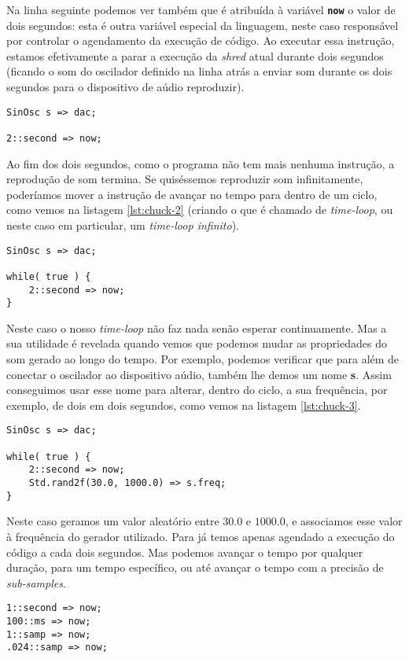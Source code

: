 Na linha seguinte podemos ver também que é atribuída à variável \textbf{\texttt{now}} o valor de dois segundos: esta é outra variável especial da linguagem, neste caso responsável por controlar o agendamento da execução de código. Ao executar essa instrução, estamos efetivamente a parar a execução da \textit{shred} atual durante dois segundos (ficando o som do oscilador definido na linha atrás a enviar som durante os dois segundos para o dispositivo de aúdio reproduzir).
\begin{lstlisting}[caption={Reproduzir um oscilador durante dois segundos},label={lst:chuck-1}]
SinOsc s => dac;

2::second => now;
\end{lstlisting}

Ao fim dos dois segundos, como o programa não tem mais nenhuma instrução, a reprodução de som termina. Se quiséssemos reproduzir som infinitamente, poderíamos mover a instrução de avançar no tempo para dentro de um ciclo, como vemos na listagem \ref{lst:chuck-2} (criando o que é chamado de \textit{time-loop}, ou neste caso em particular, um \textit{time-loop infinito}).

\begin{lstlisting}[caption={Reproduzir um oscilador infinitamente},label={lst:chuck-2}]
SinOsc s => dac;

while( true ) {
    2::second => now;
}
\end{lstlisting}

Neste caso o nosso \textit{time-loop} não faz nada senão esperar continuamente. Mas a sua utilidade é revelada quando vemos que podemos mudar as propriedades do som gerado ao longo do tempo. Por exemplo, podemos verificar que para além de conectar o oscilador ao dispositivo aúdio, também lhe demos um nome \textbf{s}. Assim conseguimos usar esse nome para alterar, dentro do ciclo, a sua frequência, por exemplo, de dois em dois segundos, como vemos na listagem \ref{lst:chuck-3}.
\begin{lstlisting}[caption={Reproduzir um oscilador, variando a frequência a cada 2 segundos},label={lst:chuck-3}]
SinOsc s => dac;

while( true ) {
    2::second => now;
    Std.rand2f(30.0, 1000.0) => s.freq;
}
\end{lstlisting}

Neste caso geramos um valor aleatório entre $30.0$ e $1000.0$, e associamos esse valor à frequência do gerador utilizado. Para já temos apenas agendado a execução do código a cada dois segundos. Mas podemos avançar o tempo por qualquer duração, para um tempo específico, ou até avançar o tempo com a precisão de \textit{sub-samples}.
\\
\begin{lstlisting}[caption={Exemplos de instruções de avanço no tempo},label={lst:chuck-4}]
1::second => now;
100::ms => now;
1::samp => now;
.024::samp => now;
\end{lstlisting}

